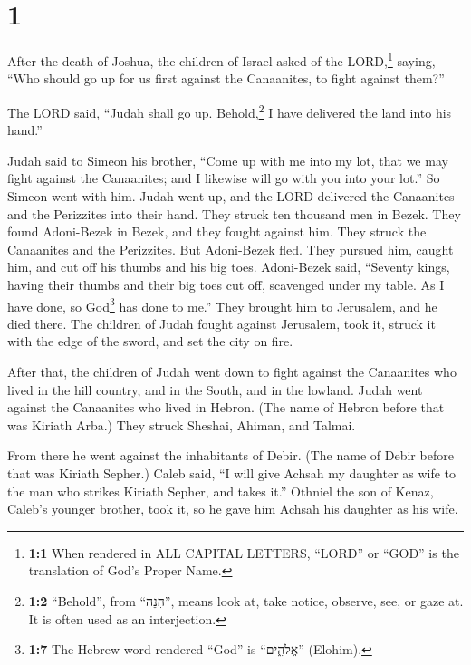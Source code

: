 \hypertarget{section}{%
\section{1}\label{section}}

 After the death of Joshua, the children of Israel asked
of the LORD,\footnote{\textbf{1:1} When rendered in ALL CAPITAL LETTERS,
  ``LORD'' or ``GOD'' is the translation of God's Proper Name.} saying,
``Who should go up for us first against the Canaanites, to fight against
them?''

 The LORD said, ``Judah shall go up. Behold,\footnote{\textbf{1:2}
  ``Behold'', from ``הִנֵּה'', means look at, take notice, observe, see,
  or gaze at. It is often used as an interjection.} I have delivered the
land into his hand.''

 Judah said to Simeon his brother, ``Come up with me into
my lot, that we may fight against the Canaanites; and I likewise will go
with you into your lot.'' So Simeon went with him.  Judah
went up, and the LORD delivered the Canaanites and the Perizzites into
their hand. They struck ten thousand men in Bezek.  They
found Adoni-Bezek in Bezek, and they fought against him. They struck the
Canaanites and the Perizzites.  But Adoni-Bezek fled. They
pursued him, caught him, and cut off his thumbs and his big toes.
 Adoni-Bezek said, ``Seventy kings, having their thumbs
and their big toes cut off, scavenged under my table. As I have done, so
God\footnote{\textbf{1:7} The Hebrew word rendered ``God'' is
  ``אֱלֹהִ֑ים'' (Elohim).} has done to me.'' They brought him to
Jerusalem, and he died there.  The children of Judah
fought against Jerusalem, took it, struck it with the edge of the sword,
and set the city on fire.

 After that, the children of Judah went down to fight
against the Canaanites who lived in the hill country, and in the South,
and in the lowland.  Judah went against the Canaanites
who lived in Hebron. (The name of Hebron before that was Kiriath Arba.)
They struck Sheshai, Ahiman, and Talmai.

 From there he went against the inhabitants of Debir.
(The name of Debir before that was Kiriath Sepher.) 
Caleb said, ``I will give Achsah my daughter as wife to the man who
strikes Kiriath Sepher, and takes it.''  Othniel the son
of Kenaz, Caleb's younger brother, took it, so he gave him Achsah his
daughter as his wife.

